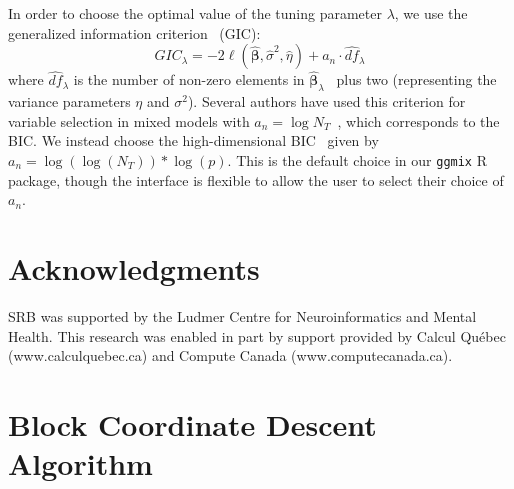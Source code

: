 \documentclass[12pt,letter]{article}\usepackage[]{graphicx}\usepackage[]{color}
\newcommand{\bbeta}{\boldsymbol{\beta}}
\begin{document}
In order to choose the optimal value of the tuning parameter $\lambda$, we use the generalized information criterion~\citep{nishii1984asymptotic} (GIC):
\begin{equation}
	GIC_{\lambda} = -2 \ell(\widehat{\bbeta}, \widehat{\sigma}^2, \widehat{\eta}) + a_n \cdot \widehat{df}_{\lambda}
\end{equation}
where $\widehat{df}_{\lambda}$ is the number of non-zero elements in $\widehat{\bbeta}_{\lambda}$~\citep{zou2007degrees} plus two (representing the variance parameters $\eta$ and $\sigma^2$). Several authors have used this criterion for variable selection in mixed models with $a_n = \log N_T$~\citep{bondell2010joint,schelldorfer2011estimation}, which corresponds to the BIC. We instead choose the high-dimensional BIC~\citep{fan2013tuning} given by $a_n = \log(\log(N_T)) * \log(p)$. This is the default choice in our \texttt{ggmix} R package, though the interface is flexible to allow the user to select their choice of $a_n$.












\newpage


\section*{Acknowledgments}

SRB was supported by the Ludmer Centre for Neuroinformatics and Mental Health. This research was enabled in part by support provided by Calcul Québec (www.calculquebec.ca) and Compute Canada (www.computecanada.ca).

%
%

%



\newpage

\appendix

\section{Block Coordinate Descent Algorithm} \label{ap:cgd}
\end{document}
